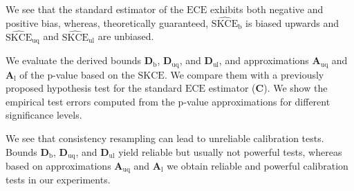 \documentclass[10pt]{article}
\newcommand*{\ECE}{\mathup{ECE}}
\newcommand*{\squaredkernelmeasure}{\mathup{SKCE}}
\newcommand*{\biasedestimator}{\widehat{\mathup{SKCE}}_{\mathup{b}}}
\newcommand*{\unbiasedestimator}{\widehat{\mathup{SKCE}}_{\mathup{uq}}}
\newcommand*{\linearestimator}{\widehat{\mathup{SKCE}}_{\mathup{ul}}}
\begin{document}
\begin{tcbposter}
{    \vspace{\baselineskip}

    We see that the standard estimator of the $\ECE$ exhibits both
    negative and positive bias, whereas, theoretically guaranteed,
    $\biasedestimator$ is biased upwards and $\unbiasedestimator$
    and $\linearestimator$ are unbiased.


    \begin{minipage}[t]{0.4\linewidth}
      \vspace*{0pt}
      We evaluate the derived bounds $\symbf{D}_{\mathup{b}}$,
      $\symbf{D}_{\mathup{uq}}$, and $\symbf{D}_{\mathup{ul}}$, and
      approximations $\symbf{A}_{\mathup{uq}}$ and
      $\symbf{A}_{\mathup{l}}$ of the p-value based on the
      $\squaredkernelmeasure$. We compare them with a previously
      proposed hypothesis test for the standard $\ECE$ estimator
      ($\symbf{C}$). We show the empirical test errors computed
      from the p-value approximations for different significance
      levels.

      \vspace{\baselineskip}

      We see that consistency resampling can lead to unreliable
      calibration tests. Bounds $\symbf{D}_{\mathup{b}}$,
      $\symbf{D}_{\mathup{uq}}$, and $\symbf{D}_{\mathup{ul}}$ yield
      reliable but usually not powerful tests, whereas
      based on approximations $\symbf{A}_{\mathup{uq}}$ and
      $\symbf{A}_{\mathup{l}}$ we obtain reliable and powerful
      calibration tests in our experiments.
    \end{minipage}%
    \begin{minipage}[t]{0.6\linewidth}
      \vspace*{0pt}
      \begin{center}
        
      \end{center}
    \end{minipage}
  }
\end{tcbposter}
\end{document}
